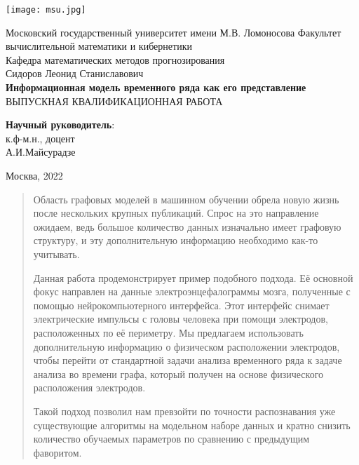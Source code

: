 \documentclass[12pt]{article}
\begin{document}
\begin{titlepage}
    \begin{center}
        
        \texttt{[image: msu.jpg]}
    
        \bigskip
        Московский государственный университет имени М.В. Ломоносова
        Факультет вычислительной математики и кибернетики\\
        Кафедра математических методов прогнозирования\\[25mm]
    
        {\Large
            Сидоров Леонид Станиславович\\[10mm]
            \LARGE\textbf{Информационная модель временного ряда как его представление}\\[20mm]
            \large ВЫПУСКНАЯ КВАЛИФИКАЦИОННАЯ РАБОТА}
        \\[30mm]
        
    
        \begin{flushright}
            \parbox{0.4\textwidth}{
                \null\hfill\textbf{Научный руководитель}:\\
                \null\hfill к.ф-м.н., доцент\\
                \null\hfill А.И.Майсурадзе
            }
        \end{flushright}
    
        \vspace{\fill}
        Москва, 2022
    \end{center}
\end{titlepage}

\begin{abstract}

Область графовых моделей в машинном обучении обрела новую жизнь после нескольких крупных публикаций. Спрос на это направление ожидаем, ведь большое количество данных изначально имеет графовую структуру, и эту дополнительную информацию необходимо как-то учитывать. 

Данная работа продемонстрирует пример подобного подхода. Её основной фокус направлен на данные электроэнцефалограммы мозга, полученные с помощью нейрокомпьютерного интерфейса. Этот интерфейс снимает электрические импульсы с головы человека при помощи электродов, расположенных по её периметру. Мы предлагаем использовать дополнительную информацию о физическом расположении электродов, чтобы перейти от стандартной задачи анализа временного ряда к задаче анализа во времени графа, который получен на основе физического расположения электродов.

Такой подход позволил нам превзойти по точности распознавания уже существующие алгоритмы на модельном наборе данных и кратно снизить количество обучаемых параметров по сравнению с предыдущим фаворитом.

\end{abstract}
\end{document}
